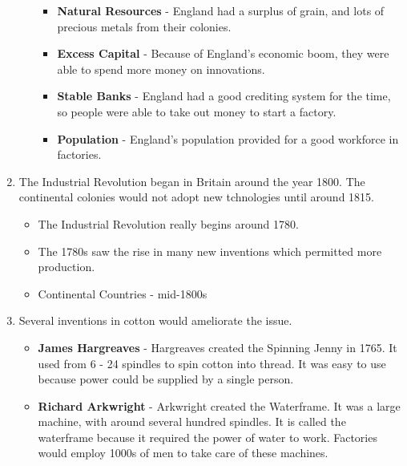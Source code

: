 \documentclass[12pt]{article}
\begin{document}
\begin{enumerate}
\begin{itemize}
\begin{itemize}[label=$\circ$]
\item \textbf{Natural Resources} - England had a surplus of grain, and lots of precious metals from their colonies.

\item \textbf{Excess Capital} - Because of England's economic boom, they were able to spend more money on innovations.

\item \textbf{Stable Banks} - England had a good crediting system for the time, so people were able to take out money to start a factory.

\item \textbf{Population} - England's population provided for a good workforce in factories.

\end{itemize}

\end{itemize}

\item The Industrial Revolution began in Britain around the year 1800. The continental colonies would not adopt new tchnologies until around 1815.\\

\begin{itemize}

\item The Industrial Revolution really begins around 1780.

\item The 1780s saw the rise in many new inventions which permitted more production.

\item Continental Countries - mid-1800s

\end{itemize}

\item Several inventions in cotton would ameliorate the issue.\\

\begin{itemize}[label=$\circ$]

\item \textbf{James Hargreaves} - Hargreaves created the Spinning Jenny in 1765. It used from 6 - 24 spindles to spin cotton into thread. It was easy to use because power could be supplied by a single person.

\item \textbf{Richard Arkwright} - Arkwright created the Waterframe. It was a large machine, with around several hundred spindles. It is called the waterframe because it required the power of water to work. Factories would employ 1000s of men to take care of these machines.


\end{itemize}
\end{enumerate}
\end{document}
